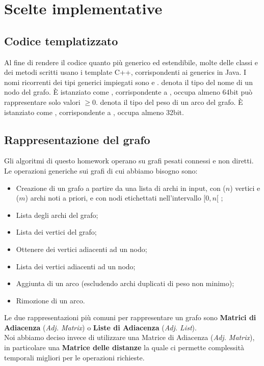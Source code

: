 \section{Scelte implementative}
\label{cap:implementation-choices}

\subsection{Codice templatizzato}

Al fine di rendere il codice quanto più generico ed estendibile, molte delle classi e dei metodi scritti
usano i template C++, corrispondenti ai generics in Java.
I nomi ricorrenti dei tipi generici impiegati sono  e .
 denota il tipo del nome di un nodo del grafo. È istanziato come , corrispondente a , occupa almeno 64bit può rappresentare solo valori $\geq 0$.
 denota il tipo del peso di un arco del grafo. È istanziato come , corrispondente a ,
occupa almeno 32bit.

\subsection{Rappresentazione del grafo}
\label{sub:graph-representation}

Gli algoritmi di questo homework operano su grafi pesati connessi e non diretti.
Le operazioni generiche sui grafi di cui abbiamo bisogno sono:

\begin{itemize}
    \item Creazione di un grafo a partire da una lista di archi in input, con ($n$) vertici e ($m$) archi noti a priori, e con nodi etichettati nell'intervallo $ [0, n[ $ ;
    \item Lista degli archi del grafo;
    \item Lista dei vertici del grafo;
    \item Ottenere dei vertici adiacenti ad un nodo;
    \item Lista dei vertici adiacenti ad un nodo;
    \item Aggiunta di un arco (escludendo archi duplicati di peso non minimo);
    \item Rimozione di un arco.
\end{itemize}

\noindent Le due rappresentazioni più comuni per rappresentare un grafo sono \textbf{Matrici di Adiacenza} (\textit{Adj. Matrix}) o \textbf{Liste di Adiacenza} (\textit{Adj. List}). \\
Noi abbiamo deciso invece di utilizzare una Matrice di Adiacenza (\textit{Adj. Matrix}), in particolare una \textbf{Matrice delle distanze}  la quale ci permette complessità temporali migliori per le operazioni richieste.

